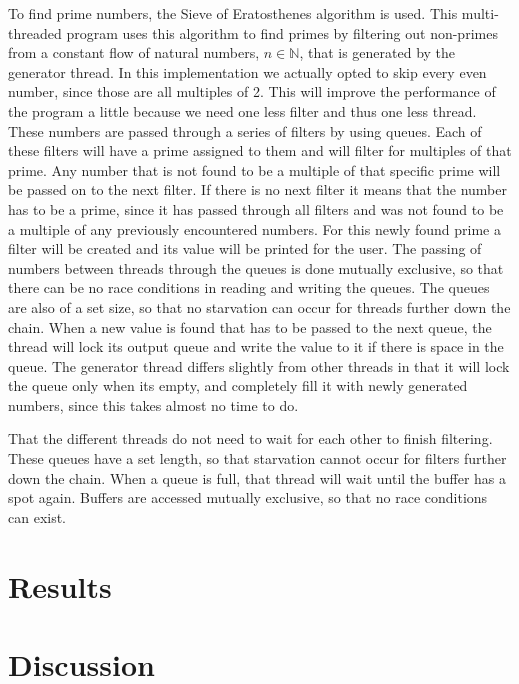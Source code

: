 \documentclass[a4paper,12px]{article}
\begin{document}
To find prime numbers, the Sieve of Eratosthenes algorithm is used. This
multi-threaded program uses this algorithm to find primes by filtering out
non-primes from a constant flow of natural numbers, $n \in \mathbb{N}$, that is
generated by the generator thread. In this implementation we actually opted to
skip every even number, since those are all multiples of 2. This will improve
the performance of the program a little because we need one less filter and thus
one less thread. These numbers are passed through a series of
filters by using queues. Each of these filters will have a prime assigned to
them and will filter for multiples of that prime. Any number that is not found
to be a multiple of that specific prime will be passed on to the next filter. If
there is no next filter it means that the number has to be a prime, since it has
passed through all filters and was not found to be a multiple of any previously
encountered numbers. For this newly found prime a filter will be created and its
value will be printed for the user. The passing of numbers between
threads through
the queues is done mutually exclusive, so that there can be no race conditions
in reading and writing the queues. The queues are also of a set size, so that no
starvation can occur for threads further down the chain. When a new value is
found that has to be passed to the next queue, the thread will lock its output
queue and write the value to it if there is space in the queue. The generator
thread differs slightly from other threads in that it will lock the queue only
when its empty, and completely fill it with newly generated numbers, since this
takes almost no time to do.


That the different threads do not need to wait for each other to finish
filtering. These queues have a set length, so that starvation cannot occur for
filters further down the chain. When a queue is full, that thread will wait
until the buffer has a spot again. Buffers are accessed mutually exclusive, so
that no race conditions can exist.



\section{Results}


\section{Discussion}


%
%
\end{document}
